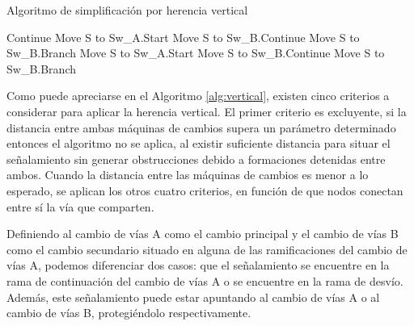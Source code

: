 	\begin{algorithm}[H]
        \caption{Algoritmo de simplificación por herencia vertical}\label{alg:vertical}
        \DontPrintSemicolon
        \SetNoFillComment
        \LinesNotNumbered 
        {
            {
                {
                    Continue\;
                }
                {
                   {
                        Move S to Sw\_A.Start\;
                   }
                   {
                        Move S to Sw\_B.Continue\;
                        Move S to Sw\_B.Branch\;
                   }
                }
                {
                   {
                        Move S to Sw\_A.Start\;
                   }
                   {
                        Move S to Sw\_B.Continue\;
                        Move S to Sw\_B.Branch\;
                   }
                }
            }
        
        }
        \KwResult{[Signals]} 
    \end{algorithm}

    Como puede apreciarse en el Algoritmo \ref{alg:vertical}, existen cinco criterios a considerar para aplicar la herencia vertical. El primer criterio es excluyente, si la distancia entre ambas máquinas de cambios supera un parámetro determinado entonces el algoritmo no se aplica, al existir suficiente distancia para situar el señalamiento sin generar obstrucciones debido a formaciones detenidas entre ambos. Cuando la distancia entre las máquinas de cambios es menor a lo esperado, se aplican los otros cuatro criterios, en función de que nodos conectan entre sí la vía que comparten.
    
    Definiendo al cambio de vías A como el cambio principal y el cambio de vías B como el cambio secundario situado en alguna de las ramificaciones del cambio de vías A, podemos diferenciar dos casos: que el señalamiento se encuentre en la rama de continuación del cambio de vías A o se encuentre en la rama de desvío. Además, este señalamiento puede estar apuntando al cambio de vías A o al cambio de vías B, protegiéndolo respectivamente. 
    

